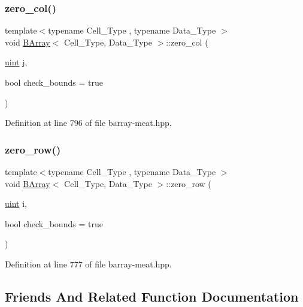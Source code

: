 \subsubsection{\texorpdfstring{zero\+\_\+col()}{zero\_col()}}
{\footnotesize\ttfamily template$<$typename Cell\+\_\+\+Type , typename Data\+\_\+\+Type $>$ \\
void \hyperlink{class_b_array}{B\+Array}$<$ Cell\+\_\+\+Type, Data\+\_\+\+Type $>$\+::zero\+\_\+col (\begin{DoxyParamCaption}\item[{\hyperlink{typedefs_8hpp_a91ad9478d81a7aaf2593e8d9c3d06a14}{uint}}]{j,  }\item[{bool}]{check\+\_\+bounds = {\ttfamily true} }\end{DoxyParamCaption})\hspace{0.3cm}{\ttfamily [inline]}}



Definition at line 796 of file barray-\/meat.\+hpp.

\mbox{\label{class_b_array_a411085fcb7530669c72d9847340f1bac}} 
\subsubsection{\texorpdfstring{zero\+\_\+row()}{zero\_row()}}
{\footnotesize\ttfamily template$<$typename Cell\+\_\+\+Type , typename Data\+\_\+\+Type $>$ \\
void \hyperlink{class_b_array}{B\+Array}$<$ Cell\+\_\+\+Type, Data\+\_\+\+Type $>$\+::zero\+\_\+row (\begin{DoxyParamCaption}\item[{\hyperlink{typedefs_8hpp_a91ad9478d81a7aaf2593e8d9c3d06a14}{uint}}]{i,  }\item[{bool}]{check\+\_\+bounds = {\ttfamily true} }\end{DoxyParamCaption})\hspace{0.3cm}{\ttfamily [inline]}}



Definition at line 777 of file barray-\/meat.\+hpp.



\subsection{Friends And Related Function Documentation}
\mbox{\label{class_b_array_a2cd2ece8a4fc1027d3151b1ec33151cb}} 
